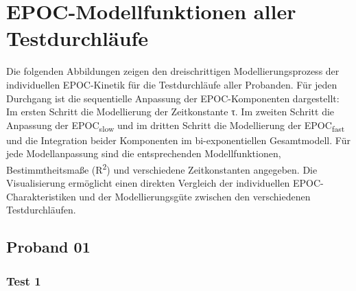 \documentclass[
  letterpaper,
  DIV=11]{scrartcl}
\begin{document}
\section{EPOC-Modellfunktionen aller
Testdurchläufe}\label{epoc-modellfunktionen-aller-testdurchluxe4ufe}

Die folgenden Abbildungen zeigen den dreischrittigen
Modellierungsprozess der individuellen EPOC-Kinetik für die
Testdurchläufe aller Probanden. Für jeden Durchgang ist die sequentielle
Anpassung der EPOC-Komponenten dargestellt: Im ersten Schritt die
Modellierung der Zeitkonstante τ. Im zweiten Schritt die Anpassung der
EPOC\textsubscript{slow} und im dritten Schritt die Modellierung der
EPOC\textsubscript{fast} und die Integration beider Komponenten im
bi-exponentiellen Gesamtmodell. Für jede Modellanpassung sind die
entsprechenden Modellfunktionen, Bestimmtheitsmaße
(R\textsuperscript{2}) und verschiedene Zeitkonstanten angegeben. Die
Visualisierung ermöglicht einen direkten Vergleich der individuellen
EPOC-Charakteristiken und der Modellierungsgüte zwischen den
verschiedenen Testdurchläufen.

\subsection{Proband 01}

\subsubsection{Test 1}
\end{document}
